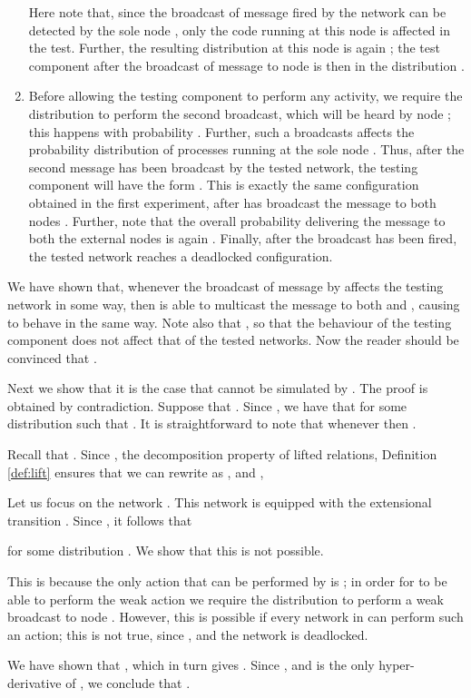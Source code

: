 \documentclass{LMCS}
\begin{document}
\begin{exa}
\begin{enumerate}
  	Here note that, since the broadcast of message  fired by the network  
  	can be detected by the sole node , only the code running at this node is affected 
  	in the test. Further, the resulting distribution at this node is again ; 
  	the test component after the broadcast of message  to node  is then in the 
  	distribution 
  	.
    \item Before allowing the testing component to perform any
        activity, we require the distribution  
        to perform the second
        broadcast, which will be heard by node ; this 
        happens with probability . Further, such a broadcasts 
        affects the probability distribution of processes running at the sole node
        . Thus, after the second message has been broadcast by
        the tested network, the testing component will have the form
        . This is exactly the same configuration
        obtained in the first experiment, after  has broadcast the message to both nodes .  Further,
        note that the overall probability    delivering the 
        message to both the external nodes is again . 
        Finally, after the broadcast has been fired, the tested network reaches 
        a deadlocked configuration.
  \end{enumerate}
  
  \noindent We have shown that, whenever the broadcast of message
   by  affects the testing network  in some way, then  is able to
  multicast the message to both  and , causing  to behave in the same way. Note also that 
  , 
  so that the behaviour of the testing component  
  does not affect that of the tested networks. 
  Now the reader should 
  be convinced that .
  
  Next we show that it is the case that  cannot
  be simulated by . The proof is obtained by
  contradiction. Suppose that . 
  Since , 
  we have that  
  for some distribution  such that . 
  It is straightforward to note that whenever  then . 
  
  Recall that . 
  Since , 
  the decomposition property of lifted relations, 
  Definition \ref{def:lift} ensures that we can rewrite 
   as , 
  and , 
  
  Let us focus on the network . 
  This network is equipped with the extensional transition 
  . 
  Since , it follows that 
   
  for some distribution . We show that this is not possible. 
  
  This is because the only action that can be performed by 
   is ; in order for  to be 
  able to perform the weak action  
  we require the distribution  
  to perform a weak broadcast to node . 
  However, this is possible if every network in  can perform such an action; this is not true, since 
  , and the network  
  is deadlocked. 
  
  We have shown that , 
  which in turn gives . Since , and  is 
  the only hyper-derivative of , we conclude 
  that . 
  \end{exa}
  
\end{document}
